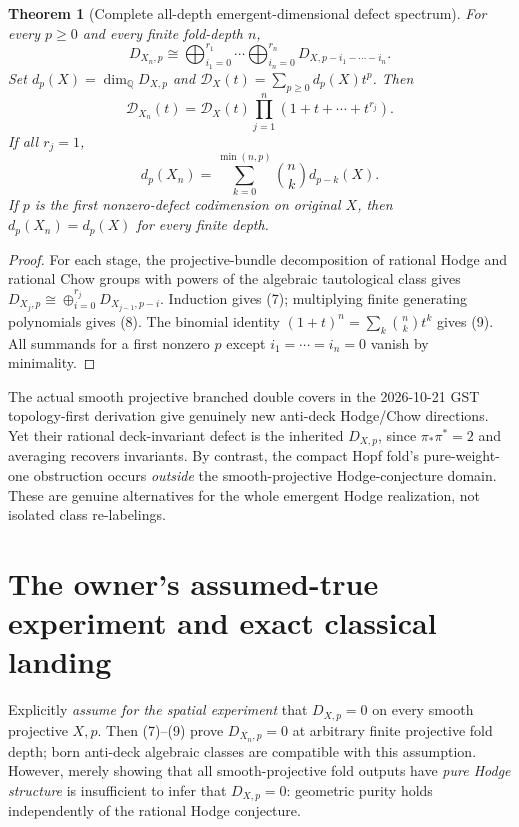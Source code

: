 \documentclass[11pt]{article}
\newtheorem{theorem}{Theorem}
\begin{document}
\begin{theorem}[Complete all-depth emergent-dimensional defect spectrum]
For every $p\ge0$ and every finite fold-depth $n$,
\[
 \boxed{
 D_{X_n,p}\cong
 \bigoplus_{i_1=0}^{r_1}\cdots
 \bigoplus_{i_n=0}^{r_n}D_{X,p-i_1-\cdots-i_n}.
 }                                                     \tag{7}
\]
Set $d_p(X)=\dim_{\mathbb Q}D_{X,p}$ and
$\mathcal D_X(t)=\sum_{p\ge0}d_p(X)t^p$. Then
\[
 \boxed{\mathcal D_{X_n}(t)=
   \mathcal D_X(t)\prod_{j=1}^n(1+t+\cdots+t^{r_j}).}  \tag{8}
\]
If all $r_j=1$,
\[
 \boxed{d_p(X_n)=\sum_{k=0}^{\min(n,p)}
                   {n\choose k}d_{p-k}(X).}          \tag{9}
\]
If $p$ is the first nonzero-defect codimension on original
$X$, then $d_p(X_n)=d_p(X)$ for \emph{every} finite depth.
\end{theorem}
\begin{proof}
For each stage, the projective-bundle decomposition of
rational Hodge and rational Chow groups with powers of
the algebraic tautological class gives
$D_{X_j,p}\cong\oplus_{i=0}^{r_j}D_{X_{j-1},p-i}$.
Induction gives (7); multiplying finite generating
polynomials gives (8). The binomial identity
$(1+t)^n=\sum_k\binom nk t^k$ gives (9).
All summands for a first nonzero $p$ except
$i_1=\cdots=i_n=0$ vanish by minimality.
\end{proof}

The actual smooth projective branched double covers in the
2026-10-21 GST topology-first derivation give genuinely
new anti-deck Hodge/Chow directions. Yet their rational
deck-invariant defect is the inherited $D_{X,p}$,
since $\pi_*\pi^*=2$ and averaging recovers invariants.
By contrast, the compact Hopf fold's pure-weight-one
obstruction occurs \emph{outside} the smooth-projective
Hodge-conjecture domain. These are genuine alternatives
for the whole emergent Hodge realization, not isolated
class re-labelings.

\section{The owner's assumed-true experiment and exact classical landing}
Explicitly \emph{assume for the spatial experiment} that
$D_{X,p}=0$ on every smooth projective $X,p$.
Then (7)--(9) prove $D_{X_n,p}=0$ at arbitrary finite
projective fold depth; born anti-deck algebraic classes
are compatible with this assumption. However, merely
showing that all smooth-projective fold outputs have
\emph{pure Hodge structure} is insufficient to infer
that $D_{X,p}=0$: geometric purity holds independently
of the rational Hodge conjecture.
\end{document}

